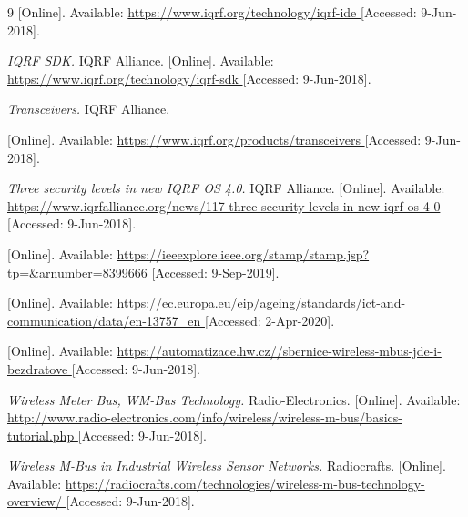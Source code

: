 \begin{thebibliography}{9}
[Online]. Available:
\url{
https://www.iqrf.org/technology/iqrf-ide
}
[Accessed: 9-Jun-2018].




\textit{
IQRF SDK.
}
IQRF Alliance.
[Online]. Available:
\url{
https://www.iqrf.org/technology/iqrf-sdk
}
[Accessed: 9-Jun-2018].



\textit{
Transceivers.
}
IQRF Alliance.

[Online]. Available:
\url{
https://www.iqrf.org/products/transceivers
}
[Accessed: 9-Jun-2018].


\textit{
Three security levels in new IQRF OS 4.0.
}
IQRF Alliance.
[Online]. Available:
\url{
https://www.iqrfalliance.org/news/117-three-security-levels-in-new-iqrf-os-4-0
}
[Accessed: 9-Jun-2018].



[Online]. Available:
\url{
https://ieeexplore.ieee.org/stamp/stamp.jsp?tp=&arnumber=8399666
}
[Accessed: 9-Sep-2019].



[Online]. Available:
\url{
https://ec.europa.eu/eip/ageing/standards/ict-and-communication/data/en-13757_en
}
[Accessed: 2-Apr-2020].


[Online]. Available:
\url{
https://automatizace.hw.cz//sbernice-wireless-mbus-jde-i-bezdratove
}
[Accessed: 9-Jun-2018].


\textit{
Wireless Meter Bus, WM-Bus Technology.
}
Radio-Electronics.
[Online]. Available:
\url{
http://www.radio-electronics.com/info/wireless/wireless-m-bus/basics-tutorial.php
}
[Accessed: 9-Jun-2018].


\textit{
Wireless M-Bus in Industrial Wireless Sensor Networks.
}
Radiocrafts.
[Online]. Available:
\url{
https://radiocrafts.com/technologies/wireless-m-bus-technology-overview/
}
[Accessed: 9-Jun-2018].




\end{thebibliography}
